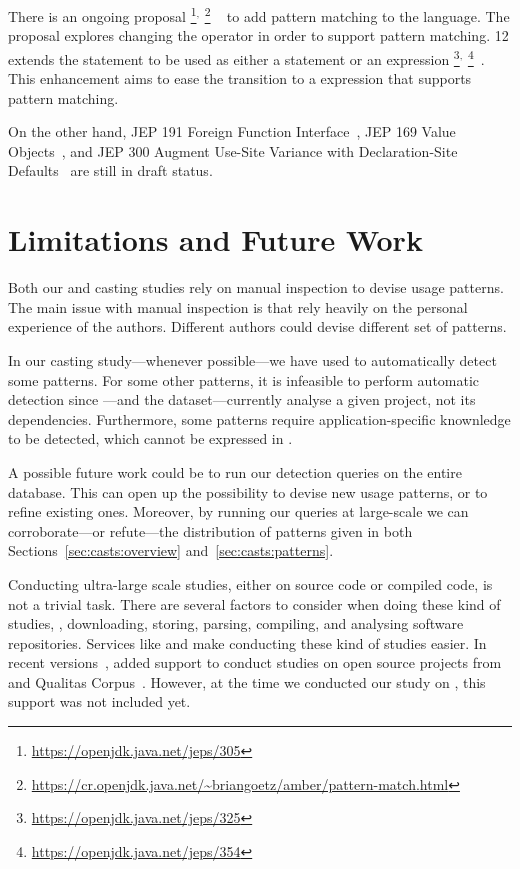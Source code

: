 There is an ongoing proposal%
\footnote{\url{https://openjdk.java.net/jeps/305}}$^{,}$%
\footnote{\url{https://cr.openjdk.java.net/~briangoetz/amber/pattern-match.html}}%
~\citep{jep305} to add pattern matching to the \java{} language.
The proposal explores changing the  operator in order to support pattern matching.
\java{} 12 extends the  statement to be used as either a statement or an expression%
\footnote{\url{https://openjdk.java.net/jeps/325}}$^{,}$%
\footnote{\url{https://openjdk.java.net/jeps/354}}~\citep{jep325,jep354}.
This enhancement aims to ease the transition to a  expression that supports pattern matching.

On the other hand,
JEP 191 Foreign Function Interface~\citep{jep191},
JEP 169 Value Objects~\citep{jep169}, and
JEP 300 Augment Use-Site Variance with Declaration-Site Defaults~\citep{jep300}
are still in draft status.

\section{Limitations and Future Work}

Both our \unsafe{} and casting studies rely on manual inspection to devise usage patterns.
The main issue with manual inspection is that rely heavily on the personal experience of the authors.
Different authors could devise different set of patterns.

In our casting study---whenever possible---we have used \ql{} to automatically detect some patterns.
For some other patterns, it is infeasible to perform automatic detection since \ql{}---and the \lgtm{} dataset---currently analyse a given project,
not its dependencies.
Furthermore, some patterns require application-specific knownledge to be detected,
which cannot be expressed in \ql{}.

A possible future work could be to run our detection queries on the entire \lgtm{} database.
This can open up the possibility to devise new usage patterns,
or to refine existing ones.
Moreover,
by running our queries at large-scale we can corroborate---or refute---the distribution of patterns given in both Sections~\ref{sec:casts:overview} and~\ref{sec:casts:patterns}.

Conducting ultra-large scale studies, either on source code or compiled code, is not a trivial task.
There are several factors to consider when doing these kind of studies,
\eg{}, downloading, storing, parsing, compiling,
and analysing software repositories.
Services like \boa{} and \lgtm{} make conducting these kind of studies easier.
In recent versions~\citep{boa-github},
\boa{} added support to conduct studies on open source projects from \github{} and Qualitas Corpus~\citep{temperoQualitasCorpusCurated2010}.
However, at the time we conducted our study on \unsafe{},
this support was not included yet.

